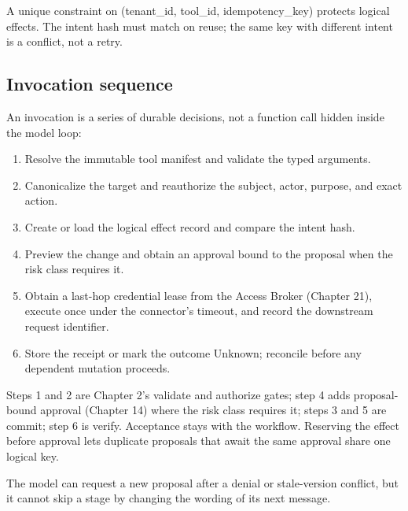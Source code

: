 A unique constraint on (tenant\_id, tool\_id, idempotency\_key) protects logical effects. The intent hash must match on reuse; the same key with different intent is a conflict, not a retry.\par

\subsection{Invocation sequence}

An invocation is a series of durable decisions, not a function call hidden inside the model loop:\par

\begin{enumerate}

\item Resolve the immutable tool manifest and validate the typed arguments.

\item Canonicalize the target and reauthorize the subject, actor, purpose, and exact action.

\item Create or load the logical effect record and compare the intent hash.

\item Preview the change and obtain an approval bound to the proposal when the risk class requires it.

\item Obtain a last-hop credential lease from the Access Broker (Chapter 21), execute once under the connector’s timeout, and record the downstream request identifier.

\item Store the receipt or mark the outcome Unknown; reconcile before any dependent mutation proceeds.

\end{enumerate}

Steps 1 and 2 are Chapter 2's validate and authorize gates; step 4 adds proposal-bound approval (Chapter 14) where the risk class requires it; steps 3 and 5 are commit; step 6 is verify. Acceptance stays with the workflow. Reserving the effect before approval lets duplicate proposals that await the same approval share one logical key.\par

The model can request a new proposal after a denial or stale-version conflict, but it cannot skip a stage by changing the wording of its next message.\par

